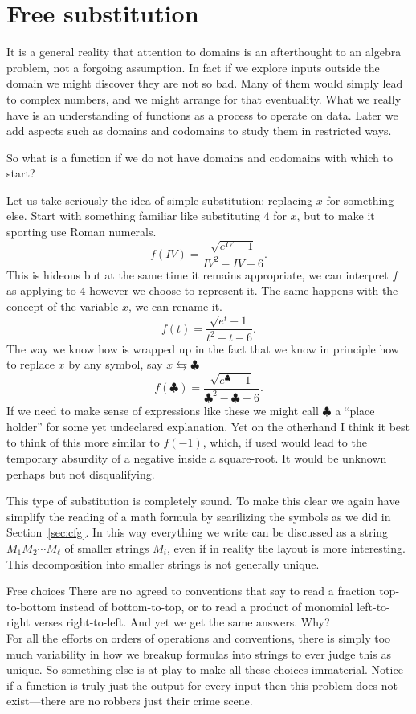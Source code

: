 \section{Free substitution}

It is a general reality that attention to domains is an af\-ter\-thought to an
algebra problem, not a forgoing assumption.  In fact if we explore inputs
outside the domain we might discover they are not so bad.  Many of them would
simply lead to complex numbers, and we might arrange for that eventuality.  
What we really have is an understanding of functions as a process to operate 
on data.  Later  we add aspects such as domains and codomains to study them in restricted ways.

So what is a function if we do not have domains and codomains with which to start?

Let us take seriously the idea of simple substitution: replacing $x$ for something else.
Start with something familiar like substituting $4$ for $x$, but to make 
it sporting use Roman numerals.
\[
    f(IV) = \frac{\sqrt{e^{IV}-1}}{IV^2-IV-6}.
\]
This is hideous but at the same time it remains appropriate, we can interpret 
$f$ as applying to $4$ however we choose to represent it.  The same happens with 
the concept of the variable $x$, we can rename it.
\[
    f(t) = \frac{\sqrt{e^{t}-1}}{t^2-t-6}.
\]
The way we know how is wrapped up in the fact that we know 
in principle how to replace $x$ by any symbol, say $x\leftrightarrows \clubsuit$
\[
    f(\clubsuit) = \frac{\sqrt{e^{\clubsuit}-1}}{\clubsuit^2-\clubsuit-6}.
\]
If we need to make sense of expressions like these we might call $\clubsuit$ 
a ``place holder'' for some yet undeclared explanation.  Yet on the otherhand 
I think it best to think of this more similar to  $f(-1)$, which, if used 
would lead to the temporary absurdity of a negative inside a square-root.
It would be unknown perhaps but not disqualifying.

This type of substitution is completely sound.  To make this clear 
we again have simplify the reading of a math formula by searilizing 
the symbols as we did in Section~\ref{sec:cfg}.
In this way everything we write can be discussed as a string $M_1 M_2\cdots M_{\ell}$
of smaller strings $M_i$, even if in reality the layout is more interesting.
This decomposition into smaller strings is not generally unique.  

\begin{remark}{Free choices}
    There are no agreed to conventions that say to read a fraction top-to-bottom
    instead of bottom-to-top, or to read a product of monomial left-to-right
    verses right-to-left. And yet we get the same answers.  Why?\\

    For all the efforts on orders of operations and conventions, there is simply 
    too much variability in how we breakup formulas into strings to ever judge this 
    as unique.  So something else is at play to make all these choices immaterial.
    Notice if a function is truly just the output for every input then this problem 
    does not exist---there are no robbers just their crime scene.
\end{remark}

